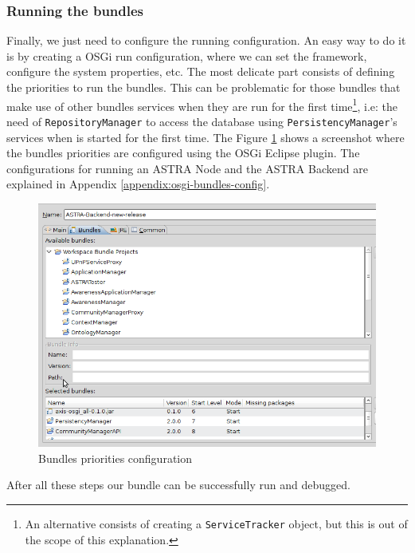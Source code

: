 \subsubsection{Running the bundles}
Finally, we just need to configure the running configuration. An easy way to
do it is by creating a OSGi run configuration, where we can set the framework,
configure the system properties, etc.
The most delicate part consists of defining the priorities to run the bundles.
This can be problematic for those bundles that make use of other bundles
services when they are run for the first time\footnote{An alternative consists
of creating a \texttt{ServiceTracker} object, but this is out of the scope of
this explanation.}, i.e: the need of \verb|RepositoryManager| to access the
database using \verb|PersistencyManager|'s services when is started for the first time.
\newline
The Figure \ref{img:screenshot-bundles-priorities} shows a screenshot where
the bundles priorities are configured using the OSGi Eclipse plugin.
The configurations for running an ASTRA Node and the ASTRA Backend are
explained in Appendix \ref{appendix:osgi-bundles-config}.

\begin{figure}[h!]
 \begin{center}
 \includegraphics[scale=0.4]{screenshots/back-end-config.png}
  \caption{\label{img:screenshot-bundles-priorities}Bundles priorities
  configuration}
 \end{center}
\end{figure}

After all these steps our bundle can be successfully run and debugged.


